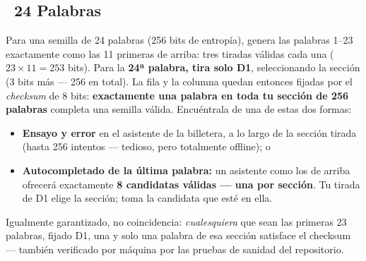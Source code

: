 \documentclass[10pt]{article}
\begin{document}
\subsection*{\faLayerGroup~24 Palabras}

Para una semilla de 24 palabras (256 bits de entropía), genera las palabras 1--23 exactamente como las 11 primeras de arriba: tres tiradas válidas cada una ($23\times11=253$ bits). Para la \textbf{24ª palabra, tira solo D1}, seleccionando la sección (3 bits más --- 256 en total). La fila y la columna quedan entonces fijadas por el \textit{checksum} de 8 bits: \textbf{exactamente una palabra en toda tu sección de 256 palabras} completa una semilla válida. Encuéntrala de una de estas dos formas:

\begin{itemize}[itemsep=1pt]
 \item \textbf{Ensayo y error} en el asistente de la billetera, a lo largo de la sección tirada (hasta 256 intentos --- tedioso, pero totalmente offline); o
 \item \textbf{Autocompletado de la última palabra:} un asistente como los de arriba ofrecerá exactamente \textbf{8 candidatas válidas --- una por sección}. Tu tirada de D1 elige la sección; toma la candidata que esté en ella.
\end{itemize}

Igualmente garantizado, no coincidencia: \emph{cualesquiera} que sean las primeras 23 palabras, fijado D1, una y solo una palabra de esa sección satisface el checksum --- también verificado por máquina por las pruebas de sanidad del repositorio.
\end{document}
